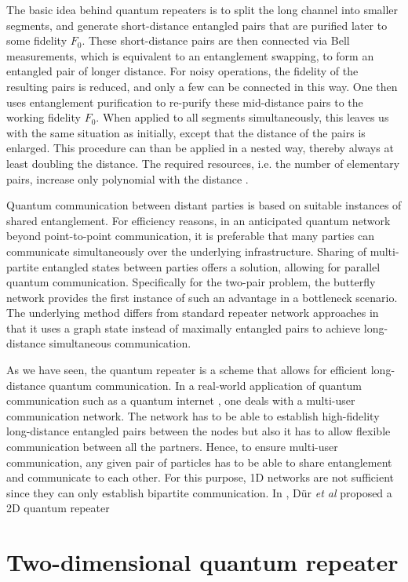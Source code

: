 \documentclass[10pt,a4paper]{book}
\numberwithin{equation}{chapter}
\numberwithin{figure}{chapter}
\numberwithin{table}{chapter}
\begin{document}
The basic idea behind quantum repeaters is to split the long channel into smaller segments, and generate short-distance entangled pairs that are purified later to some fidelity $F_0$. These short-distance pairs are then connected via Bell measurements, which is equivalent to an entanglement swapping, to form an entangled pair of longer distance. For noisy operations, the fidelity of the resulting pairs is reduced, and only a few can be connected in this way. One then uses entanglement purification to re-purify these mid-distance pairs to the working fidelity $F_0$. When applied to all segments simultaneously, this leaves us with the same situation as initially, except that the distance of the pairs is enlarged. This procedure can than be applied in a nested way, thereby always at least doubling the distance. The required resources, i.e. the number of elementary pairs, increase only polynomial with the distance \cite{QR98}.


Quantum communication between distant parties is based on suitable instances of shared entanglement. For
efficiency reasons, in an anticipated quantum network beyond point-to-point communication, it is preferable that many parties can communicate simultaneously over the underlying infrastructure. Sharing of multi-partite entangled states between parties offers a solution, allowing for parallel quantum communication. Specifically for the two-pair problem, the butterfly network provides the first instance of such an advantage in a bottleneck scenario. The underlying method differs from standard repeater network approaches in that it uses a graph state instead of maximally entangled pairs to achieve long-distance simultaneous communication. 


As we have seen, the quantum repeater is a scheme that allows for efficient long-distance quantum communication. In a real-world application of quantum communication such as a quantum internet \cite{QI}, one deals with a multi-user communication network. The network has to be able to establish high-fidelity long-distance entangled pairs between the nodes but also it has to allow flexible communication between all the partners. Hence, to ensure multi-user communication, any given pair of particles has to be able to share entanglement and communicate to each other. For this purpose, 1D networks are not sufficient since they can only establish bipartite communication. In \cite{twodim}, Dür \textit{et al} proposed a 2D quantum repeater 



\section{Two-dimensional quantum repeater}
\end{document}
